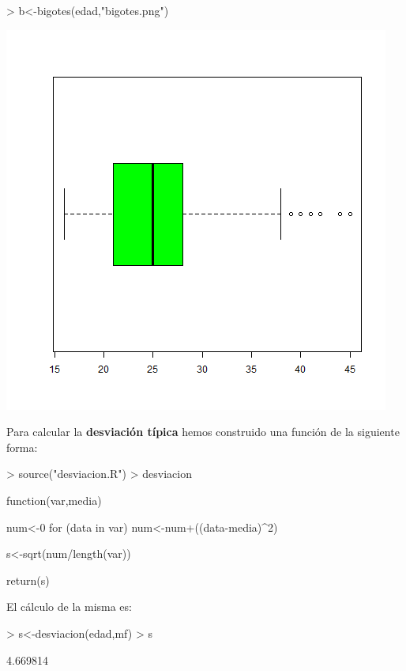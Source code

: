 \documentclass [a4paper] {article}
\begin{document}
\begin{Schunk}
\begin{Sinput}
> b<-bigotes(edad,"bigotes.png")
\end{Sinput}
\end{Schunk}
\includegraphics[width=\textwidth]{bigotes}

Para calcular la \textbf{desviaci\'on t\'ipica} hemos construido una funci\'on de la siguiente
forma:
\begin{Schunk}
\begin{Sinput}
> source("desviacion.R")
> desviacion
\end{Sinput}
\begin{Soutput}
function(var,media) {
    num<-0
    for (data in var){
        num<-num+((data-media)^2)
    }

    s<-sqrt(num/length(var))

    return(s)
}
\end{Soutput}
\end{Schunk}

El c\'alculo de la misma es:
\begin{Schunk}
\begin{Sinput}
> s<-desviacion(edad,mf)
> s
\end{Sinput}
\begin{Soutput}
[1] 4.669814
\end{Soutput}
\end{Schunk}
\end{document}
